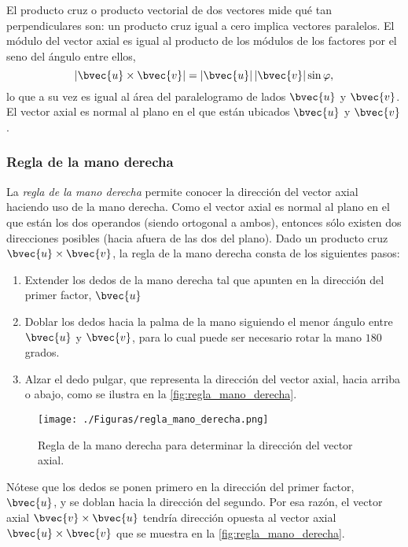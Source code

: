 \documentclass{fmbnotes}
\begin{document}
El producto cruz o producto vectorial de dos vectores mide qué tan perpendiculares son: un producto cruz igual a cero implica vectores paralelos. El módulo del vector axial es igual al producto de los módulos de los factores por el seno del ángulo entre ellos,
\[ \left|\bvec{u} \times \bvec{v}\right| = \left|\bvec{u}\right|\left|\bvec{v}\right| \sin \varphi,\]
lo que a su vez es igual al área del paralelogramo de lados \( \bvec{u} \) y \( \bvec{v} \). El vector axial es normal al plano en el que están ubicados \( \bvec{u} \) y \( \bvec{v} \). 

\subsubsection{Regla de la mano derecha}

La \emph{regla de la mano derecha} permite conocer la dirección del vector axial haciendo uso de la mano derecha. Como el vector axial es normal al plano en el que están los dos operandos (siendo ortogonal a ambos), entonces sólo existen dos direcciones posibles (hacia afuera de las dos  del plano). Dado un producto cruz \(\bvec{u}\times\bvec{v}\), la regla de la mano derecha consta de los siguientes pasos:

\begin{enumerate}[label=\arabic*\textdegree.]
	\item Extender los dedos de la mano derecha tal que apunten en la dirección del primer factor, \(\bvec{u}\)
	\item Doblar los dedos hacia la palma de la mano siguiendo el menor ángulo entre \(\bvec{u}\) y \(\bvec{v}\), para lo cual puede ser necesario rotar la mano \(180\) grados.
	\item Alzar el dedo pulgar, que representa la dirección del vector axial, hacia arriba o abajo, como se ilustra en la \autoref{fig:regla_mano_derecha}.
\end{enumerate}

\begin{figure}[h]
\centering
\texttt{[image: ./Figuras/regla\_mano\_derecha.png]}
\caption{\centering Regla de la mano derecha para determinar la dirección del vector axial. }
\label{fig:regla_mano_derecha}
\end{figure}

Nótese que los dedos se ponen primero en la dirección del primer factor, \(\bvec{u}\), y se doblan hacia la dirección del segundo. Por esa razón, el vector axial \(\bvec{v}\times\bvec{u}\) tendría dirección opuesta al vector axial \(\bvec{u}\times\bvec{v}\) que se muestra en la \autoref{fig:regla_mano_derecha}.
\end{document}
